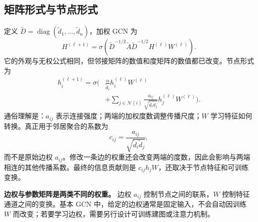 \documentclass[UTF8,a4paper,11pt,fontset=fandol]{ctexart}
\begin{document}
\subsection{矩阵形式与节点形式}
定义 $\widetilde D=\operatorname{diag}(\widetilde d_1,\ldots,\widetilde d_n)$，加权 GCN 为
\begin{equation}
\boxed{
H^{(\ell+1)}=\sigma\!\left(
\widetilde D^{-1/2}\widetilde A\widetilde D^{-1/2}
H^{(\ell)}W^{(\ell)}\right).
}
\label{eq:weighted-gcn}
\end{equation}
它的外观与无权公式相同，但邻接矩阵的数值和度矩阵的数值都已改变。节点形式为
\begin{equation}
\begin{split}
h_i^{(\ell+1)}=\sigma\!\Bigg(&
\frac{\alpha}{\widetilde d_i}h_i^{(\ell)}W^{(\ell)}\\
&+\sum_{j\in\mathcal N(i)}
\frac{a_{ij}}{\sqrt{\widetilde d_i\widetilde d_j}}
 h_j^{(\ell)}W^{(\ell)}\Bigg).
\end{split}
\label{eq:weighted-node}
\end{equation}
通俗理解是：$a_{ij}$ 表示连接强度；两端的加权度数调整传播尺度；$W$ 学习特征如何转换。真正用于邻居聚合的系数为
\begin{equation}
c_{ij}=\frac{a_{ij}}{\sqrt{\widetilde d_i\widetilde d_j}},
\end{equation}
而不是原始边权 $a_{ij}$。修改一条边的权重还会改变两端的度数，因此会影响与两端相连的其他传播系数。最终的信息贡献则是 $c_{ij}h_jW$，还取决于节点特征和可训练变换。

\textbf{边权与参数矩阵是两类不同的权重。} 边权 $a_{ij}$ 控制节点之间的联系，$W$ 控制特征通道之间的变换。基本 GCN 中，给定的边权通常是固定输入，不会自动因训练 $W$ 而改变；若要学习边权，需要另行设计可训练建图或注意力机制。
\end{document}
